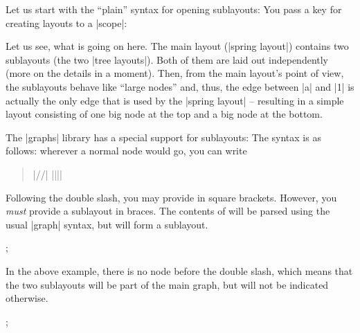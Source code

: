 Let us start with the ``plain'' syntax for opening sublayouts: You pass a key
for creating layouts to a |scope|:
%
\begin{codeexample}[preamble={\usetikzlibrary{graphdrawing}
\usegdlibrary{force,trees}}]
\end{codeexample}

Let us see, what is going on here. The main layout (|spring layout|) contains
two sublayouts (the two |tree layouts|). Both of them are laid out
independently (more on the details in a moment). Then, from the main layout's
point of view, the sublayouts behave like ``large nodes'' and, thus, the edge
between |a| and |1| is actually the only edge that is used by the
|spring layout| -- resulting in a simple layout consisting of one big node at
the top and a big node at the bottom.

The |graphs| library has a special support for sublayouts: The syntax is as
follows: wherever a normal node would go, you can write
%
\begin{quote}
    |//|  |{||}|
\end{quote}

Following the double slash, you may provide  in square
brackets. However, you \emph{must} provide a sublayout in braces. The contents
of  will be parsed using the usual |graph| syntax, but will
form a sublayout.
%
\begin{codeexample}[preamble={\usetikzlibrary{graphs,graphdrawing}
\usegdlibrary{force,trees}}]
\tikz {};
\end{codeexample}

In the above example, there is no node before the double slash, which means
that the two sublayouts will be part of the main graph, but will not be
indicated otherwise.
%
\begin{codeexample}[preamble={\usetikzlibrary{graphs,graphdrawing}
\usegdlibrary{circular,trees}}]
\tikz {};
\end{codeexample}

